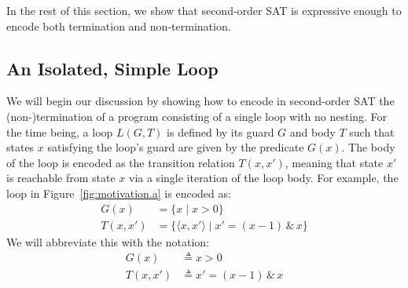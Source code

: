 \documentclass[a4paper]{llncs}
\begin{document}
In the rest of this section, we show that second-order SAT 
is expressive enough to encode both termination and non-termination. 



\subsection{An Isolated, Simple Loop}

We will begin our discussion by showing how to encode in second-order SAT the
\mbox{(non-)termination} of a program consisting of a single loop with no nesting.
For the time being, a loop $L(G, T)$ is defined by its guard $G$ and body $T$
such that states $x$ satisfying the loop's guard are given by the
predicate $G(x)$.  The body of the loop is encoded as the transition
relation $T(x, x')$, meaning that state $x'$ is reachable from state $x$ via
a single iteration of the loop body.  For example, the loop in
Figure~\ref{fig:motivation.a} is encoded as:
%
\begin{align*}
G(x) & = \{ x \mid x>0 \} \\
T(x,x') &= \{ \langle x, x' \rangle \mid x' = (x - 1) \, \& \, x \}
\end{align*}
We will abbreviate this with the notation:
\begin{align*}
G(x) & \triangleq x > 0 \\
T(x, x') & \triangleq x' = (x - 1) \, \& \, x
\end{align*}
\end{document}
